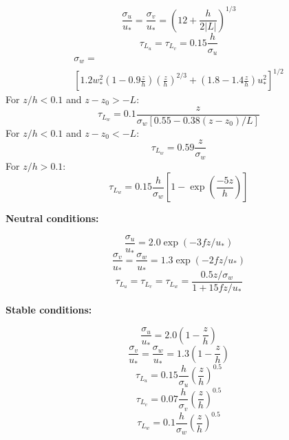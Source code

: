 \documentclass{egu}            %
\begin{document}
\begin{equation}
\frac{\sigma_u}{u_*}=\frac{\sigma_v}{u_*}=\left(12+\frac{h}{2|L|}\right)^{1/3}
\end{equation}
\begin{equation}
\tau_{L_u}=\tau_{L_v}=0.15\frac{h}{\sigma_u}
\end{equation}
\begin{multline}
\sigma_w=\\
\left[ 1.2 w_*^2 \left (1-0.9\frac{z}{h} \right )
\left ( \frac{z}{h} \right )^{2/3}
+\left (1.8-1.4 \frac{z}{h} \right ) u_*^2 \right]^{1/2}
\end{multline}
For $z/h<0.1$ and $z-z_0>-L$:
\begin{equation}
\tau_{L_w}=0.1\frac{z}{\sigma_w\left[0.55-0.38\left(z-z_0\right)/L\right]}
\end{equation}
For $z/h<0.1$ and $z-z_0<-L$:
\begin{equation}
\tau_{L_w}=0.59\frac{z}{\sigma_w}
\end{equation}
For $z/h>0.1$:
\begin{equation}
\tau_{L_w}=0.15\frac{h}{\sigma_w}\left[1-\exp\left(\frac{-5z}{h}\right)\right]
\end{equation}

{\bf Neutral conditions:}

\begin{equation}
\frac{\sigma_u}{u_*}=2.0\exp(-3fz/u_*)
\end{equation}
\begin{equation}
\frac{\sigma_v}{u_*}=\frac{\sigma_w}{u_*}=1.3\exp(-2fz/u_*)
\end{equation}
\begin{equation}
\tau_{L_u}=\tau_{L_v}=\tau_{L_w}=\frac{0.5z/\sigma_w}{1+15fz/u_*}
\end{equation}

{\bf Stable conditions:}

\begin{equation}
\frac{\sigma_u}{u_*}=2.0\left(1-\frac{z}{h}\right)
\end{equation}
\begin{equation}
\frac{\sigma_v}{u_*}=\frac{\sigma_w}{u_*}=1.3\left(1-\frac{z}{h}\right)
\end{equation}
\begin{equation}
\tau_{L_u}=0.15\frac{h}{\sigma_u}\left(\frac{z}{h}\right)^{0.5}
\end{equation}
\begin{equation}
\tau_{L_v}=0.07\frac{h}{\sigma_v}\left(\frac{z}{h}\right)^{0.5}
\end{equation}
\begin{equation}
\tau_{L_w}=0.1\frac{h}{\sigma_w}\left(\frac{z}{h}\right)^{0.5}
\end{equation}
\end{document}
